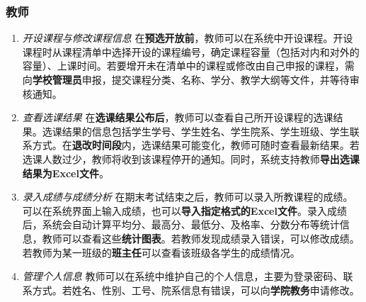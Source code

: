 \subsubsection{教师}
\begin{enumerate}
    \item \textit{开设课程与修改课程信息} \quad 在\textbf{预选开放前}，教师可以在系统中开设课程。开设课程时从课程清单中选择开设的课程编号，确定课程容量（包括对内和对外的容量）、上课时间。若要增开未在清单中的课程或修改由自己申报的课程，需向\textbf{学校管理员}申报，提交课程分类、名称、学分、教学大纲等文件，并等待审核通知。
    \item \textit{查看选课结果} \quad 在\textbf{选课结果公布后}，教师可以查看自己所开设课程的选课结果。选课结果的信息包括学生学号、学生姓名、学生院系、学生班级、学生联系方式。在\textbf{退改时间段}内，选课结果可能变化，教师可随时查看最新结果。若选课人数过少，教师将收到该课程停开的通知。同时，系统支持教师\textbf{导出选课结果为Excel文件}。
    \item \textit{录入成绩与成绩分析} \quad 在期末考试结束之后，教师可以录入所教课程的成绩。可以在系统界面上输入成绩，也可以\textbf{导入指定格式的Excel文件}。录入成绩后，系统会自动计算平均分、最高分、最低分、及格率、分数分布等统计信息，教师可以查看这些\textbf{统计图表}。若教师发现成绩录入错误，可以修改成绩。若教师为某一班级的\textbf{班主任}可以查看该班级各学生的成绩情况。
    \item \textit{管理个人信息} \quad 教师可以在系统中维护自己的个人信息，主要为登录密码、联系方式。若姓名、性别、工号、院系信息有错误，可以向\textbf{学院教务}申请修改。
\end{enumerate}

